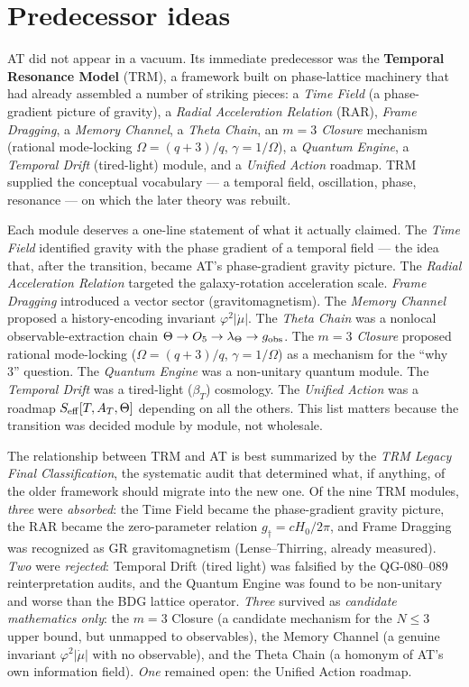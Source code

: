 \documentclass[10pt,twoside,openany]{book}
\begin{document}
\section{Predecessor ideas}

AT did not appear in a vacuum. Its immediate predecessor was the \textbf{Temporal
Resonance Model} (TRM), a framework built on phase-lattice machinery that had already
assembled a number of striking pieces: a \emph{Time Field} (a phase-gradient picture of
gravity), a \emph{Radial Acceleration Relation} (RAR), \emph{Frame Dragging},
a \emph{Memory Channel}, a \emph{Theta Chain}, an \emph{$m=3$ Closure} mechanism (rational
mode-locking $\Omega=(q+3)/q$, $\gamma=1/\Omega$), a \emph{Quantum Engine}, a
\emph{Temporal Drift} (tired-light) module, and a \emph{Unified Action} roadmap. TRM
supplied the conceptual vocabulary --- a temporal field, oscillation, phase, resonance ---
on which the later theory was rebuilt.

Each module deserves a one-line statement of what it actually claimed. The \emph{Time
Field} identified gravity with the phase gradient of a temporal field --- the idea that,
after the transition, became AT's phase-gradient gravity picture. The \emph{Radial
Acceleration Relation} targeted the galaxy-rotation acceleration scale. \emph{Frame
Dragging} introduced a vector sector (gravitomagnetism). The \emph{Memory Channel} proposed
a history-encoding invariant $\varphi^2|\dot\mu|$. The \emph{Theta Chain} was a nonlocal
observable-extraction chain $\Theta\to O_5\to\lambda_\Theta\to g_{\rm obs}$. The \emph{$m=3$
Closure} proposed rational mode-locking ($\Omega=(q+3)/q$, $\gamma=1/\Omega$) as a mechanism
for the ``why 3'' question. The \emph{Quantum Engine} was a non-unitary quantum module. The
\emph{Temporal Drift} was a tired-light ($\beta_T$) cosmology. The \emph{Unified Action}
was a roadmap $S_{\rm eff}[T,A_T,\Theta]$ depending on all the others. This list matters
because the transition was decided module by module, not wholesale.

The relationship between TRM and AT is best summarized by the \emph{TRM Legacy Final
Classification}, the systematic audit that determined what, if anything, of the older
framework should migrate into the new one. Of the nine TRM modules, \emph{three} were
\emph{absorbed}: the Time Field became the phase-gradient gravity picture, the RAR became
the zero-parameter relation $g_\dagger = cH_0/2\pi$, and Frame Dragging was recognized as
GR gravitomagnetism (Lense--Thirring, already measured). \emph{Two} were \emph{rejected}:
Temporal Drift (tired light) was falsified by the QG-080--089 reinterpretation audits, and
the Quantum Engine was found to be non-unitary and worse than the BDG lattice operator.
\emph{Three} survived as \emph{candidate mathematics only}: the $m=3$ Closure (a candidate
mechanism for the $N\le3$ upper bound, but unmapped to observables), the Memory Channel
(a genuine invariant $\varphi^2|\dot\mu|$ with no observable), and the Theta Chain (a
homonym of AT's own information field). \emph{One} remained open: the Unified Action
roadmap.
\end{document}
